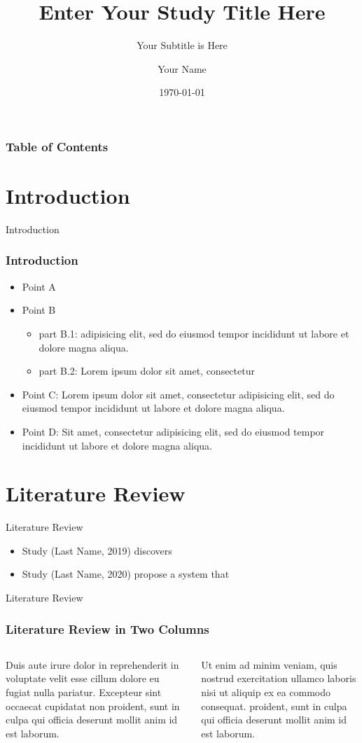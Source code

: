 \documentclass[10pt]{beamer}
\title[University of Wisconsin Milwaukee]{Enter Your Study Title Here}
\subtitle{ Your Subtitle is Here}
\author[Your Name]{Your Name}
\institute[]{University of Wisconsin Milwaukee}
\date[\textcolor{white}{\today} ]
{\today}
\begin{document}
	\frame{\titlepage}
	\begin{frame}
		\frametitle{Table of Contents}
		\tableofcontents
	\end{frame}



	\section{Introduction}
	\begin{frame}{Introduction}
		\frametitle{Introduction}
		\begin{itemize}
			\item Point A
			\item Point B
			\begin{itemize}
				\item part B.1: adipisicing elit, sed do eiusmod tempor incididunt ut labore et dolore magna aliqua.
				\item part B.2: Lorem ipsum dolor sit amet, consectetur
			\end{itemize}
			\item Point C: Lorem ipsum dolor sit amet, consectetur adipisicing elit, sed do eiusmod tempor incididunt ut labore et dolore magna aliqua.
			\item Point D: Sit amet, consectetur adipisicing elit, sed do eiusmod tempor incididunt ut labore et dolore magna aliqua.
		\end{itemize}
	\end{frame}


	\section{Literature Review}

	\begin{frame}{Literature Review}


		\begin{itemize}
			\item  Study (Last Name, 2019) discovers
			\item  Study (Last Name, 2020) propose a system that
		\end{itemize}
	\end{frame}

	\begin{frame}{Literature Review}
		\frametitle{Literature Review in Two Columns}
		\begin{columns}

			\column{0.4\textwidth}
			Duis aute irure dolor in reprehenderit in voluptate velit esse cillum dolore eu fugiat nulla pariatur.
			Excepteur sint occaecat cupidatat non proident, sunt in culpa qui officia deserunt mollit anim id est laborum.

			\column{0.4\textwidth}
			Ut enim ad minim veniam, quis nostrud exercitation ullamco laboris nisi ut aliquip ex ea commodo consequat.
			proident, sunt in culpa qui officia deserunt mollit anim id est laborum.

		\end{columns}
	\end{frame}
\end{document}
